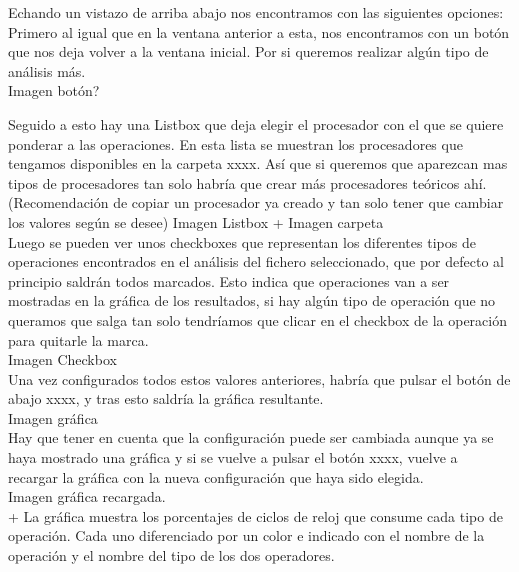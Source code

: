 Echando un vistazo de arriba abajo nos encontramos con las siguientes opciones:\\

Primero al igual que en la ventana anterior a esta, nos encontramos con un botón que nos deja volver a la ventana inicial. Por si queremos realizar algún tipo de análisis más.\\

Imagen botón?

Seguido a esto hay una Listbox que deja elegir el procesador con el que se quiere ponderar a las operaciones. En esta lista se muestran los procesadores que tengamos disponibles en la carpeta xxxx. Así que si queremos que aparezcan mas tipos de procesadores tan solo habría que crear más procesadores teóricos ahí.\\

(Recomendación de copiar un procesador ya creado y tan solo tener que cambiar los valores según se desee)
Imagen Listbox + Imagen carpeta\\

Luego se pueden ver unos checkboxes que representan los diferentes tipos de operaciones encontrados en el análisis del fichero seleccionado, que por defecto al principio saldrán todos marcados. Esto indica que operaciones van a ser mostradas en la gráfica de los resultados, si hay algún tipo de operación que no queramos que salga tan solo tendríamos que clicar en el checkbox de la operación para quitarle la marca.\\
Imagen Checkbox\\

Una vez configurados todos estos valores anteriores, habría que pulsar el botón de abajo xxxx, y tras esto saldría la gráfica resultante.\\

Imagen gráfica\\

Hay que tener en cuenta que la configuración puede ser cambiada aunque ya se haya mostrado una gráfica y si se vuelve a pulsar el botón xxxx, vuelve a recargar la gráfica con la nueva configuración que haya sido elegida.\\

Imagen gráfica recargada.\\

+ La gráfica muestra los porcentajes de ciclos de reloj que consume cada tipo de operación. Cada uno diferenciado por un color e indicado con el nombre de la operación y el nombre del tipo de los dos operadores.


